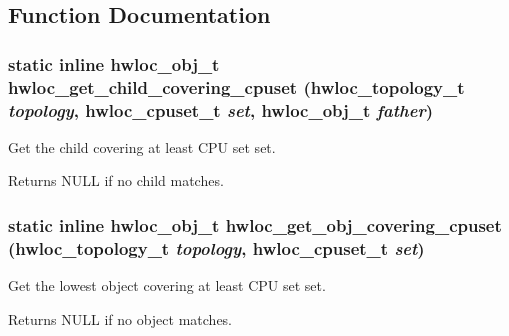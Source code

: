 \subsection{Function Documentation}
\hypertarget{group__hwlocality__helper__find__covering_ga8f38a876af68365766fff3785bc6a201}{
\subsubsection[{hwloc\_\-get\_\-child\_\-covering\_\-cpuset}]{\setlength{\rightskip}{0pt plus 5cm}static inline {\bf hwloc\_\-obj\_\-t} hwloc\_\-get\_\-child\_\-covering\_\-cpuset ({\bf hwloc\_\-topology\_\-t} {\em topology}, \/  {\bf hwloc\_\-cpuset\_\-t} {\em set}, \/  {\bf hwloc\_\-obj\_\-t} {\em father})}}
\label{group__hwlocality__helper__find__covering_ga8f38a876af68365766fff3785bc6a201}


Get the child covering at least CPU set {\ttfamily set}. \begin{DoxyReturn}{Returns}
{\ttfamily NULL} if no child matches. 
\end{DoxyReturn}
\hypertarget{group__hwlocality__helper__find__covering_gaf495236e86281fedf1fda14f1e1a8ce4}{
\subsubsection[{hwloc\_\-get\_\-obj\_\-covering\_\-cpuset}]{\setlength{\rightskip}{0pt plus 5cm}static inline {\bf hwloc\_\-obj\_\-t} hwloc\_\-get\_\-obj\_\-covering\_\-cpuset ({\bf hwloc\_\-topology\_\-t} {\em topology}, \/  {\bf hwloc\_\-cpuset\_\-t} {\em set})}}
\label{group__hwlocality__helper__find__covering_gaf495236e86281fedf1fda14f1e1a8ce4}


Get the lowest object covering at least CPU set {\ttfamily set}. \begin{DoxyReturn}{Returns}
{\ttfamily NULL} if no object matches. 
\end{DoxyReturn}
